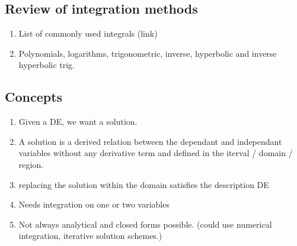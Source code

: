 \documentclass{article}
\begin{document}
\subsection{Review of integration methods}
\begin{enumerate}
  \item List of commonly used integrals (link)
  \item Polynomials, logarithms, trigonometric, inverse, hyperbolic and inverse hyperbolic trig.
\end{enumerate}

\subsection{Concepts}
\begin{enumerate}
  \item Given a DE, we want a solution.
  \item A solution is a derived relation between the dependant and independant variables without any derivative term and defined in the iterval / domain / region.
  \item replacing the solution within the domain satisfies the description DE
  \item Needs integration on one or two variables
  \item Not always analytical and closed forms possible. (could use numerical integration, iterative solution schemes.)
\end{enumerate}
\end{document}
